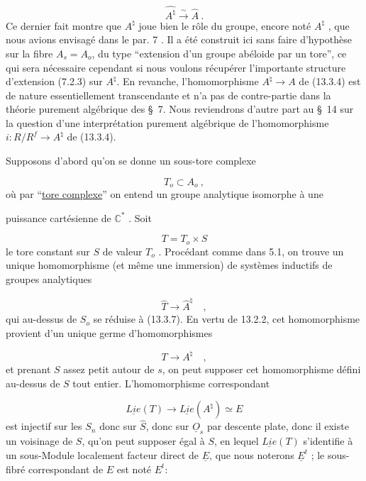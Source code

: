 \begin{equation}\tag{13.3.6}
\widehat{A^\natural} \stackrel{\sim}{\longrightarrow} \hat{A} \ .
\end{equation}
Ce dernier fait montre que $A^\natural$ joue bien le rôle du groupe, encore noté $A^\natural$ , que nous avions envisagé dans le par. 7 . Il a été construit ici sans faire d'hypothèse sur la fibre $A_s = A_o$, du type ``extension d'un groupe abéloide par un tore'', ce qui sera nécessaire cependant si nous voulons récupérer l'importante structure d'extension (7.2.3) sur $A^\natural$. En revanche, l'homomorphisme $A^\natural \longrightarrow A$ de (13.3.4) est de nature essentiellement transcendante et n'a pas de contre-partie dans la théorie purement algébrique des \S~7. Nous reviendrons d'autre part au \S~14 sur la question d'une interprétation purement algébrique de l'homomorphisme $i : R/R^f \longrightarrow A^\natural$ de (13.3.4).

Supposons d'abord qu'on se donne un sous-tore complexe

\begin{equation}\tag{13.3.7}
T_o \subset A_o \ ,
\end{equation}
où par ``\underline{tore complexe}'' on entend un groupe analytique isomorphe à une



puissance cartésienne de $\mathbb{C}^*$ . Soit

\begin{equation}\tag{13.3.8}
T = T_o \times S
\end{equation}
le tore constant sur $S$ de valeur $T_o$ . Procédant comme dans 5.1, on trouve un unique homomorphisme (et même une immersion) de systèmes inductifs de groupes analytiques

\begin{equation*}
\hat{T} \longrightarrow \hat{A}^{\natural} \quad ,
\end{equation*}
qui au-dessus de $S_o$ se réduise à (13.3.7). En vertu de 13.2.2, cet homomorphisme provient d'un unique germe d'homomorphismes

\begin{equation}\tag{13.3.9}
T \longrightarrow A^{\natural} \quad ,
\end{equation}
et prenant $S$ assez petit autour de $s$, on peut supposer cet homomorphisme défini au-dessus de $S$ tout entier. L'homomorphisme correspondant

\begin{equation*}
\underline{Lie}(T) \longrightarrow \underline{Lie}(A^{\natural}) \simeq E
\end{equation*}
est injectif sur les $S_n$ donc sur $\hat{S}$, donc sur $\underline{O}_s$ par descente plate, donc il existe un voisinage de $S$, qu'on peut supposer égal à $S$, en lequel $\underline{Lie}(T)$ s'identifie à un sous-Module localement facteur direct de $\underline{E}$, que nous noterons $\underline{E}^t$ ; le sous-fibré correspondant de $E$ est noté $E^t$:

